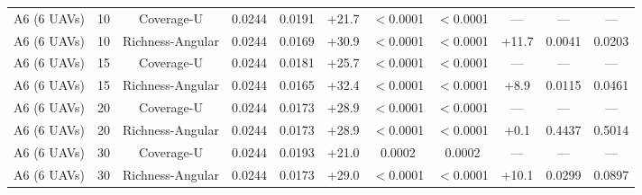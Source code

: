 \documentclass[journal]{IEEEtran}
\newcommand{\CU}{Coverage-U}
\newcommand{\RA}{Richness-Angular}
\begin{document}
\begin{table}[t]
\begin{tabular}{l c c c c c c c c c c}
A6 (6 UAVs) & 10 & \CU & 0.0244 & 0.0191 & +21.7 & $<$0.0001 & $<$0.0001 & --- & --- & --- \\
A6 (6 UAVs) & 10 & \RA & 0.0244 & 0.0169 & +30.9 & $<$0.0001 & $<$0.0001 & +11.7 & 0.0041 & 0.0203 \\
A6 (6 UAVs) & 15 & \CU & 0.0244 & 0.0181 & +25.7 & $<$0.0001 & $<$0.0001 & --- & --- & --- \\
A6 (6 UAVs) & 15 & \RA & 0.0244 & 0.0165 & +32.4 & $<$0.0001 & $<$0.0001 & +8.9 & 0.0115 & 0.0461 \\
A6 (6 UAVs) & 20 & \CU & 0.0244 & 0.0173 & +28.9 & $<$0.0001 & $<$0.0001 & --- & --- & --- \\
A6 (6 UAVs) & 20 & \RA & 0.0244 & 0.0173 & +28.9 & $<$0.0001 & $<$0.0001 & +0.1 & 0.4437 & 0.5014 \\
A6 (6 UAVs) & 30 & \CU & 0.0244 & 0.0193 & +21.0 & 0.0002 & 0.0002 & --- & --- & --- \\
A6 (6 UAVs) & 30 & \RA & 0.0244 & 0.0173 & +29.0 & $<$0.0001 & $<$0.0001 & +10.1 & 0.0299 & 0.0897 \\
\bottomrule
\end{tabular}
\end{table}
\end{document}
